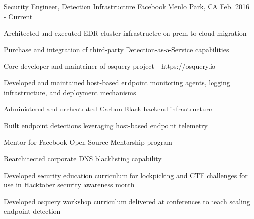 


\begin{cventries}




\cventry
{Security Engineer, Detection Infrastructure} %
{Facebook} %
{Menlo Park, CA} %
{Feb. 2016 - Current} %
{ %
\begin{cvitems}
\item {Architected and executed EDR cluster infrastructre on-prem to cloud migration}
\item {Purchase and integration of third-party Detection-as-a-Service capabilities}
\item {Core developer and maintainer of osquery project - https://osquery.io}
\item {Developed and maintained host-based endpoint monitoring agents, logging infrastructure, and deployment mechanisms}
\item {Administered and orchestrated Carbon Black backend infrastructure}
\item {Built endpoint detections leveraging host-based endpoint telemetry}
\item {Mentor for Facebook Open Source Mentorship program}
\item {Rearchitected corporate DNS blacklisting capability}
\item {Developed security education curriculum for lockpicking and CTF challenges for use in Hacktober security awareness month}
\item {Developed osquery workshop curriculum delivered at conferences to teach scaling endpoint detection}
\end{cvitems}
}


\end{cventries}
